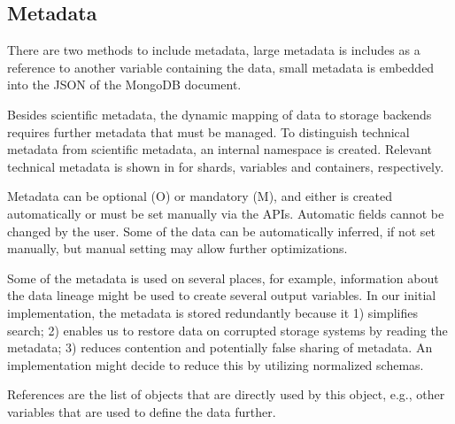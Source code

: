 \subsection{Metadata}

There are two methods to include metadata, large metadata is includes as a reference to another variable containing the data, small metadata is embedded into the JSON of the MongoDB document.

Besides scientific metadata, the dynamic mapping of data to storage backends requires further metadata that must be managed.
To distinguish technical metadata from scientific metadata, an internal namespace is created.
Relevant technical metadata is shown in  for shards, variables and containers, respectively.

Metadata can be optional (O) or mandatory (M), and either is created automatically or must be set manually via the APIs.
Automatic fields cannot be changed by the user.
Some of the data can be automatically inferred, if not set manually, but manual setting may allow further optimizations.

Some of the metadata is used on several places, for example, information about the data lineage might be used to create several output variables.
In our initial implementation, the metadata is stored redundantly because it
1) simplifies search; 2) enables us to restore data on corrupted storage systems by reading the metadata; 3) reduces contention and potentially false sharing of metadata.
An implementation might decide to reduce this by utilizing normalized schemas.

References are the list of objects that are directly used by this object, e.g., other variables that are used to define the data further.

